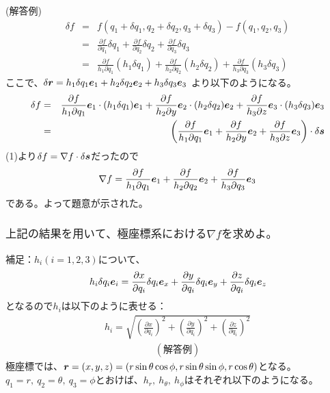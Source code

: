 \documentclass[a4paper,11pt,fleqn]{jarticle}
\def \vec#1{\mbox{\boldmath $#1$}} %
\begin{document}
(解答例)
\begin{eqnarray*}
\delta{f}&=&f(q_1+\delta{q_1},q_2+\delta{q_2},q_3+\delta{q_3})-f(q_1,q_2,q_3)\\
&=&\frac{\partial{f}}{\partial{q_1}}\delta{q_1}+\frac{\partial{f}}{\partial{q_2}}\delta{q_2}+\frac{\partial{f}}{\partial{q_3}}\delta{q_3}\\
&=&\frac{\partial{f}}{h_1\partial{q_1}}(h_1\delta{q_1})+\frac{\partial{f}}{h_2\partial{q_2}}(h_2\delta{q_2})+\frac{\partial{f}}{h_3\partial{q_3}}(h_3\delta{q_3})
\end{eqnarray*}
ここで、$\delta{\vec{r}}=h_1\delta{q_1}\vec{e}_1+h_2\delta{q_2}\vec{e}_2+h_3\delta{q_3}\vec{e}_3$
より以下のようになる。
\begin{eqnarray*}
\delta{f}&=&\frac{\partial{f}}{h_1\partial{q_1}}\vec{e}_1\cdot(h_1\delta{q_1})\vec{e}_1+\frac{\partial{f}}{h_2\partial{y}}\vec{e}_2\cdot(h_2\delta{q_2})\vec{e}_2+\frac{\partial{f}}{h_3\partial{z}}\vec{e}_3\cdot(h_3\delta{q_3})\vec{e}_3\\
&=&\left(\frac{\partial{f}}{h_1\partial{q_1}}\vec{e}_1+\frac{\partial{f}}{h_2\partial{y}}\vec{e}_2+\frac{\partial{f}}{h_3\partial{z}}\vec{e}_3\right)\cdot\delta\vec{s}
\end{eqnarray*}
(1)より$\delta{f}=\nabla{f}\cdot\delta\vec{s}$だったので
\begin{eqnarray*}
\nabla{f}=\frac{\partial{f}}{h_1\partial{q_1}}\vec{e}_1+\frac{\partial{f}}{h_2\partial{q_2}}\vec{e}_2+\frac{\partial{f}}{h_3\partial{q_3}}\vec{e}_3
\end{eqnarray*}
である。よって題意が示された。

\newpage
\subsubsection{$上記の結果を用いて、極座標系における\nabla fを求めよ。$}
補足：$h_i(i=1,2,3)$について、
\begin{eqnarray*}
h_i\delta{q}_i\vec{e}_i=\frac{\partial{x}}{\partial{q_i}}\delta{q}_i\vec{e}_x+\frac{\partial{y}}{\partial{q_i}}\delta{q}_i\vec{e}_y
+\frac{\partial{z}}{\partial{q_i}}\delta{q}_i\vec{e}_z
\end{eqnarray*}
となるので$h_i$は以下のように表せる：
\begin{eqnarray*}
h_i=\sqrt{\left(\frac{\partial{x}}{\partial{q_i}}\right)^2+\left(\frac{\partial{y}}{\partial{q_i}}\right)^2+\left(\frac{\partial{z}}{\partial{q_i}}\right)^2}
\end{eqnarray*}
\begin{eqnarray*}
(解答例)
\end{eqnarray*}
極座標では、$\vec{r}=(x,y,z)=(r\sin\theta\cos\phi ,r\sin\theta\sin\phi ,r\cos\theta)$となる。\\
$q_1=r,~q_2=\theta ,~q_3=\phi$とおけば、$h_r,~h_{\theta},~h_{\phi}$はそれぞれ以下のようになる。
\end{document}
